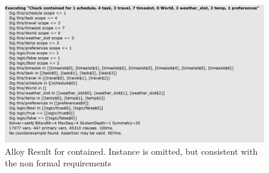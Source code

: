 \begin{figure}[H]
\centering
\includegraphics[scale=0.7]{Pictures/assert_noTaskContained.PNG}
\caption{Alloy Result for contained. Instance is omitted, but
consistent with the non formal requirements}
\end{figure}

